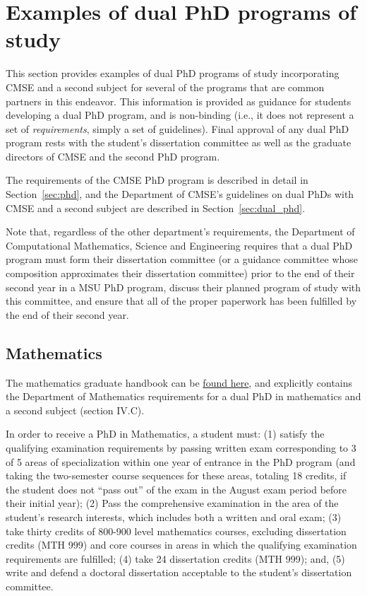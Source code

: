 \section{Examples of dual PhD programs of study}
\label{sec:dual_phd_examples}

This section provides examples of dual PhD programs of study
incorporating CMSE and a second subject for several of the programs
that are common partners in this endeavor.  This information is
provided as guidance for students developing a dual PhD program, and
is non-binding (i.e., it does not represent a set of
\textit{requirements}, simply a set of guidelines).  Final approval of
any dual PhD program rests with the student's dissertation committee
as well as the graduate directors of CMSE and the second PhD program.

The requirements of the CMSE PhD program is described in detail in
Section~\ref{sec:phd}, and the Department of CMSE's guidelines on dual
PhDs with CMSE and a second subject are described in
Section~\ref{sec:dual_phd}.

Note that, regardless of the other department's requirements, the
Department of Computational Mathematics, Science and Engineering
requires that a dual PhD program must form their dissertation
committee (or a guidance committee whose composition approximates
their dissertation committee) prior to the end of their second year in
a MSU PhD program, discuss their planned program of study with this
committee, and ensure that all of the proper paperwork has been
fulfilled by the end of their second year.

\subsection{Mathematics}

The mathematics graduate handbook can be
\href{https://math.msu.edu/graduate/files/handbook/Graduate_Student_Handbook.pdf}{found
  here}, and explicitly contains the Department of Mathematics
requirements for a dual PhD in mathematics and a second subject
(section IV.C).

In order to receive a PhD in Mathematics, a student must: (1) satisfy
the qualifying examination requirements by passing written exam
corresponding to 3 of 5 areas of specialization within one year of
entrance in the PhD program (and taking the two-semester course
sequences for these areas, totaling 18 credits, if
the student does not ``pass out'' of the exam in the August exam
period before their initial year);
(2) Pass the comprehensive examination in the area of the
student's research interests, which includes both a written and oral
exam; (3) take thirty credits of 800-900 level mathematics courses,
excluding dissertation credits (MTH 999) and core courses in areas in
which the qualifying examination requirements are fulfilled; (4) take
24 dissertation credits (MTH 999); and, (5) write and defend a
doctoral dissertation acceptable to the student's dissertation
committee.

